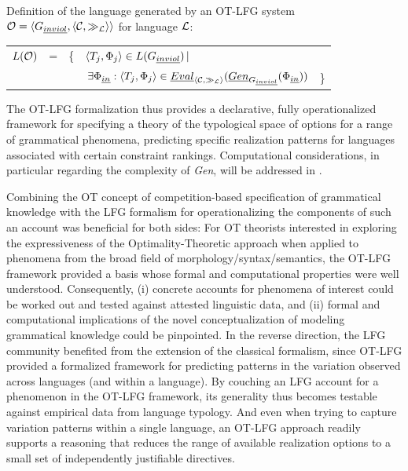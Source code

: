 \documentclass[output=paper,hidelinks]{langscibook}
\begin{document}
\ea\label{ex:OT-Lang-def}
Definition of the language generated by an OT-LFG system ${\cal O} = \langle G_{\emph{inviol}},\langle{\cal C},\gg_{\cal{L}}\rangle\rangle$ for language ${\cal L}$:

\setlength{\tabcolsep}{3pt}
\begin{tabular}[t]{lllll}
 $L(\cal{O})$ & = & \{ & $\langle T_j, \Phi_j\rangle\in L(G_{\emph{inviol}}) \, | $\\
  & & & $\, \exists \Phi_{\emph{in}}: \langle T_j, \Phi_j\rangle\in \emph{Eval}_{\langle\cal{C},\gg_{\cal{L}}\rangle}(\emph{Gen}_{G_{\emph{inviol}}}(\Phi_{\emph{in}}))$ & \} \\
\end{tabular}
\z

The OT-LFG formalization thus provides a declarative, fully operationalized  framework for specifying a theory of the typological space of options for a range of grammatical phenomena, predicting specific realization patterns for languages associated with certain constraint rankings.
Computational considerations, in particular regarding the complexity of \emph{Gen}, will be addressed in .


Combining the OT concept of competition-based specification of grammatical knowledge with the LFG formalism for operationalizing the components of such an account was beneficial for both sides: For OT theorists interested in exploring the expressiveness of the Optimality-Theoretic approach when applied to phenomena from the broad field of morphology/syntax/semantics, the OT-LFG framework provided a basis whose formal and computational properties were well understood. Consequently, (i) concrete accounts for phenomena of interest could be worked out and tested against attested linguistic data, and (ii) formal and computational implications of the novel conceptualization of modeling grammatical knowledge could be pinpointed. In the reverse direction, the LFG community benefited from the extension of the classical formalism, since OT-LFG provided a formalized framework for predicting patterns in the variation observed across languages (and within a language). By couching an LFG account for a phenomenon in the OT-LFG framework, its generality thus becomes testable against empirical data from language typology. And even when trying to capture variation patterns within a single language, an OT-LFG approach readily supports a reasoning that reduces the range of available realization options to a small set of independently justifiable directives.
\end{document}
